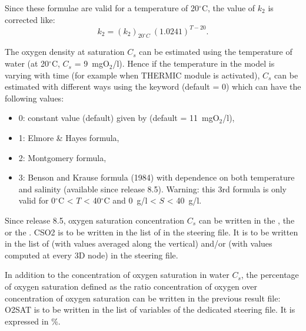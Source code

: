 
Since these formulae are valid for a temperature of 20$^\circ$C,
the value of $k_2$ is corrected like:
\begin{equation*}
  k_2 = \left( k_2 \right)_{20^\circ C}\ \left( 1.0241 \right)^{T-20}.
\end{equation*}


The oxygen density at saturation $C_s$ can be estimated
using the temperature of water (at 20$^\circ$C, $C_s$ = 9~mgO$_2$/l).
Hence if the temperature in the model is varying with time
(for example when THERMIC module is activated),
$C_s$ can be estimated with different ways using the keyword
 (default = 0) which can have the following values:

\begin{itemize}
\item 0: constant value (default) given by
   (default = 11~mgO$_2$/l),
\item 1: Elmore \& Hayes formula,
\item 2: Montgomery formula,
\item 3: Benson and Krause formula (1984) \cite{BensonKrause1984}
with dependence on both temperature and salinity (available since release 8.5).
Warning: this 3rd formula is only valid for 0$^\circ$C < $T$ < 40$^\circ$C
and 0~g/l < $S$ < 40~g/l.
\end{itemize}

Since release 8.5, oxygen saturation concentration $C_s$ can be written in the
 , the  
or the  .
CSO2 is to be written in the list of 
in the  steering file.
It is to be written in the list of 
(with values averaged along the vertical) and/or
 (with values computed at every
3D node) in the  steering file.

In addition to the concentration of oxygen saturation in water $C_s$, the
percentage of oxygen saturation defined as the ratio concentration of oxygen over
concentration of oxygen saturation can be written in the previous result file:
O2SAT is to be written in the list of variables of the dedicated \tel steering
file.
It is expressed in \%.

